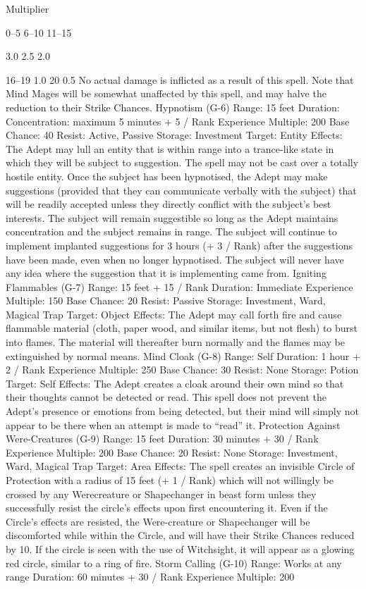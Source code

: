 \documentclass[a4paper]{article}
\begin{document}
\begin{multicols}{3}
Multiplier

0–5
6–10
11–15

3.0
2.5
2.0

16–19 1.0
20
0.5
No actual damage is inflicted as a result of this
spell. Note that Mind Mages will be somewhat
unaffected by this spell, and may halve the reduction to their Strike Chances.
Hypnotism (G-6)
Range: 15 feet
Duration: Concentration: maximum 5 minutes + 5
/ Rank
Experience Multiple: 200
Base Chance: 40%
Resist: Active, Passive
Storage: Investment
Target: Entity
Effects: The Adept may lull an entity that is within
range into a trance-like state in which they will be
subject to suggestion. The spell may not be cast
over a totally hostile entity. Once the subject has
been hypnotised, the Adept may make suggestions
(provided that they can communicate verbally with
the subject) that will be readily accepted unless
they directly conflict with the subject’s best interests. The subject will remain suggestible so long as
the Adept maintains concentration and the subject
remains in range. The subject will continue to
implement implanted suggestions for 3 hours (+ 3 /
Rank) after the suggestions have been made, even
when no longer hypnotised. The subject will never
have any idea where the suggestion that it is implementing came from.
Igniting Flammables (G-7)
Range: 15 feet + 15 / Rank
Duration: Immediate
Experience Multiple: 150
Base Chance: 20%
Resist: Passive
Storage: Investment, Ward, Magical Trap
Target: Object
Effects: The Adept may call forth fire and cause
flammable material (cloth, paper wood, and similar
items, but not flesh) to burst into flames. The material will thereafter burn normally and the flames
may be extinguished by normal means.
Mind Cloak (G-8)
Range: Self
Duration: 1 hour + 2 / Rank
Experience Multiple: 250
Base Chance: 30%
Resist: None
Storage: Potion
Target: Self
Effects: The Adept creates a cloak around their
own mind so that their thoughts cannot be detected
or read. This spell does not prevent the Adept’s
presence or emotions from being detected, but their
mind will simply not appear to be there when an
attempt is made to “read” it.
Protection Against Were-Creatures (G-9)
Range: 15 feet
Duration: 30 minutes + 30 / Rank
Experience Multiple: 200
Base Chance: 20%
Resist: None
Storage: Investment, Ward, Magical Trap
Target: Area
Effects: The spell creates an invisible Circle of
Protection with a radius of 15 feet (+ 1 / Rank)
which will not willingly be crossed by any Werecreature or Shapechanger in beast form unless they
successfully resist the circle’s effects upon first
encountering it. Even if the Circle’s effects are
resisted, the Were-creature or Shapechanger will
be discomforted while within the Circle, and will
have their Strike Chances reduced by 10. If the
circle is seen with the use of Witchsight, it will
appear as a glowing red circle, similar to a ring of
fire.
Storm Calling (G-10)
Range: Works at any range
Duration: 60 minutes + 30 / Rank
Experience Multiple: 200


\end{multicols}
\end{document}
